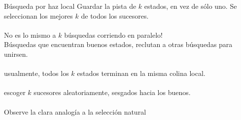 \begin{frame}{B\'usqueda por haz local}
     Guardar la pista de $k$ estados, en vez de s\'olo uno. Se seleccionan los mejores $k$ de todos los sucesores.\\~\\
    
    No es lo mismo a $k$ b\'usquedas corriendo en paralelo!\\
    B\'usquedas que encuentran buenos estados, reclutan a otras b\'usquedas para unirsen.\\~\\
    
     usualmente, todos los $k$ estados terminan en la misma colina local.\\~\\
    
     escoger $k$ sucesores aleatoriamente, sesgados hacia los buenos.\\~\\
    
    Observe la clara analog\'ia a la selecci\'on natural

\end{frame}
